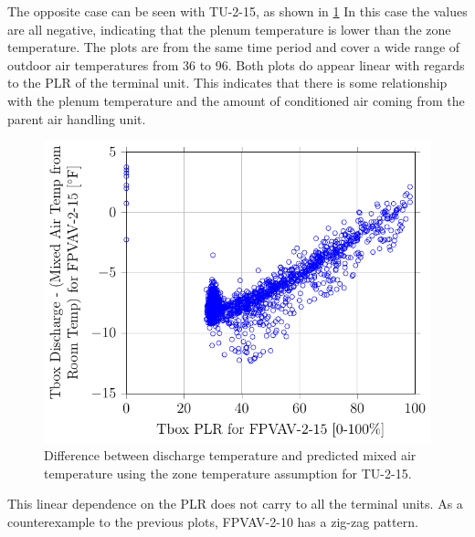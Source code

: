 The opposite case can be seen with TU-2-15, as shown in \figref{}
\ref{fig:2017-01-09-1434-TboxDischargeMixedAirTempfromRoomTempforFPVAV215vsTboxPLRforFPVAV215}
In this case the values are all negative, indicating that the plenum
temperature is lower than the zone temperature. The plots are from the
same time period and cover a wide range of outdoor air temperatures from
\SI{36}{\degreeF} to \SI{96}{\degreeF}. Both plots do appear linear with
regards to the PLR of the terminal unit. This indicates that there is
some relationship with the plenum temperature and the amount of
conditioned air coming from the parent air handling unit.

\begin{figure}
\centering
\includegraphics[]{Plots/2017-01-09-1434-TboxDischargeMixedAirTempfromRoomTempforFPVAV215vsTboxPLRforFPVAV215.pdf}
\caption{Difference between discharge temperature and predicted mixed
air temperature using the zone temperature assumption for TU-2-15.}
\label{fig:2017-01-09-1434-TboxDischargeMixedAirTempfromRoomTempforFPVAV215vsTboxPLRforFPVAV215}
\end{figure}


This linear dependence on the PLR does not carry to all the terminal
units. As a counterexample to the previous plots, FPVAV-2-10 has a
zig-zag pattern. 


